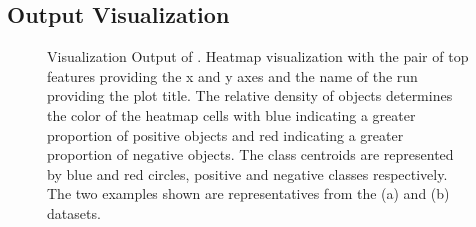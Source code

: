 
\subsection{Output Visualization}\label{ssec:viz}

\begin{figure}[h]
\centering %
\vspace{-3mm}
\vspace{-5mm}
\caption{Visualization Output of \genviz. Heatmap visualization with the pair of top features providing the x and y axes and the name of the run providing the plot title. The relative density of objects determines the color of the heatmap cells with blue indicating a greater proportion of positive objects and red indicating a greater proportion of negative objects. The class centroids are represented by blue and red circles, positive and negative classes respectively. The two examples shown are representatives from the (a) \msig and (b) \lincs datasets. }
\vspace{-5mm}
\label{fig:viz}
\end{figure}
 

